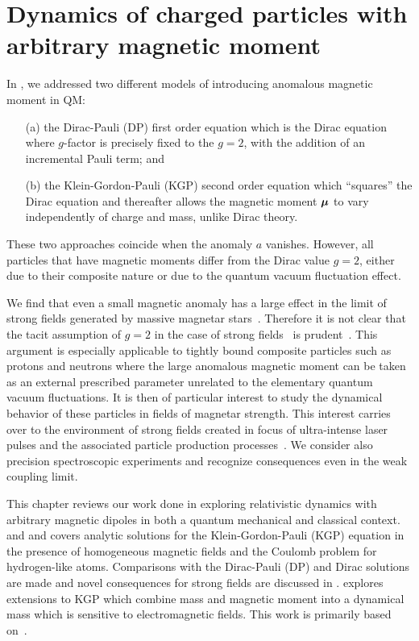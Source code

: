 \chapter{Dynamics of charged particles with arbitrary magnetic moment}
\label{chap:moment}
\noindent In , we addressed two different models of introducing anomalous magnetic moment in QM: 
\begin{enumerate}
\item[(a)] the Dirac-Pauli (DP) first order equation which is the Dirac equation where $g$-factor is precisely fixed to the $g\!=\!2$, with the addition of an incremental Pauli term; and
\item[(b)] the Klein-Gordon-Pauli (KGP) second order equation which ``squares'' the Dirac equation and thereafter allows the magnetic moment $\boldsymbol{\mu}$ to vary independently of charge and mass, unlike Dirac theory.
\end{enumerate} 
These two approaches coincide when the anomaly $a$ vanishes. However, all particles that have magnetic moments differ from the Dirac value $g\!=\!2$, either due to their composite nature or due to the quantum vacuum fluctuation effect.

We find that even a small magnetic anomaly has a large effect in the limit of strong fields generated by massive magnetar stars~\citep{Kaspi:2017fwg}. Therefore it is not clear that the tacit assumption of $g\!=\!2$ in the case of strong fields~\citep{Rafelski:1976ts,Greiner:1985ce,Rafelski:2016ixr} is prudent~\citep{Evans:2018kor}. This argument is especially applicable to tightly bound composite particles such as protons and neutrons where the large anomalous magnetic moment can be taken as an external prescribed parameter unrelated to the elementary quantum vacuum fluctuations. It is then of particular interest to study the dynamical behavior of these particles in fields of magnetar strength. This interest carries over to the environment of strong fields created in focus of ultra-intense laser pulses and the associated particle production processes~\citep{Dunne:2014qda,Hegelich:2014tda}. We consider also precision spectroscopic experiments and recognize consequences even in the weak coupling limit.

This chapter reviews our work done in exploring relativistic dynamics with arbitrary magnetic dipoles in both a quantum mechanical and classical context.  and  and covers analytic solutions for the Klein-Gordon-Pauli (KGP) equation in the presence of homogeneous magnetic fields and the Coulomb problem for hydrogen-like atoms. Comparisons with the Dirac-Pauli (DP) and Dirac solutions are made and novel consequences for strong fields are discussed in .  explores extensions to KGP which combine mass and magnetic moment into a dynamical mass which is sensitive to electromagnetic fields. This work is primarily based on~\cite{Steinmetz:2018ryf}.

